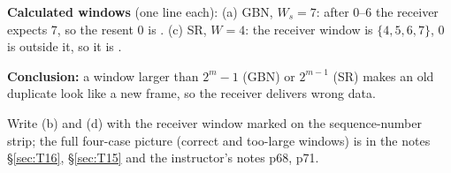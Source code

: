 \begin{solution}
{
\par}

\smallskip
\textbf{Calculated windows} (one line each): (a) GBN, $W_s=7$: after 0--6 the receiver expects 7, so the resent 0 is . (c) SR, $W=4$: the receiver window is $\{4,5,6,7\}$, 0 is outside it, so it is .

\textbf{Conclusion:} a window larger than $2^m-1$ (GBN) or $2^{m-1}$ (SR) makes an old duplicate look like a new frame, so the receiver delivers wrong data.
\end{solution}
\begin{examtip}Write (b) and (d) with the receiver window marked on the sequence-number strip; the full four-case picture (correct and too-large windows) is in the notes \S\ref{sec:T16}, \S\ref{sec:T15} and the instructor's notes p68, p71.\end{examtip}

